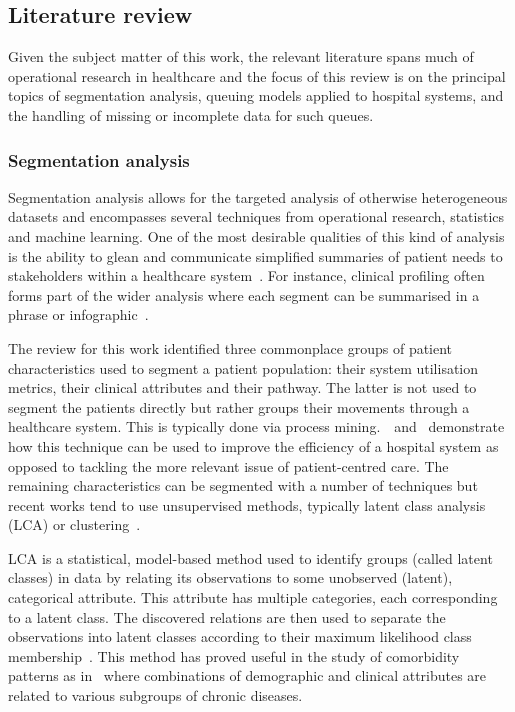\subsection{Literature review}\label{subsec:review}

Given the subject matter of this work, the relevant literature spans much of
operational research in healthcare and the focus of this review is on the
principal topics of segmentation analysis, queuing models applied to hospital
systems, and the handling of missing or incomplete data for such queues.

\subsubsection{Segmentation analysis}

Segmentation analysis allows for the targeted analysis of otherwise
heterogeneous datasets and encompasses several techniques from operational
research, statistics and machine learning. One of the most desirable qualities
of this kind of analysis is the ability to glean and communicate simplified
summaries of patient needs to stakeholders within a healthcare
system~\cite{Vuik2016b, Yoon2020}. For instance, clinical profiling often
forms part of the wider analysis where each segment can be summarised in a
phrase or infographic~\cite{Vuik2016a, Yan2019}.

The review for this work identified three commonplace groups of patient
characteristics used to segment a patient population: their system
utilisation metrics, their clinical attributes and their pathway. The latter
is not used to segment the patients directly but rather groups their movements
through a healthcare system. This is typically done via process
mining.~\cite{Arnolds2018}~and~\cite{Delias2015} demonstrate how this technique
can be used to improve the efficiency of a hospital system as opposed to
tackling the more relevant issue of patient-centred care. The remaining
characteristics can be segmented with a number of techniques but recent works
tend to use unsupervised methods, typically latent class analysis (LCA) or
clustering~\cite{Yan2018}.

LCA is a statistical, model-based method used to identify groups (called latent
classes) in data by relating its observations to some unobserved (latent),
categorical attribute. This attribute has multiple categories, each
corresponding to a latent class. The discovered relations are then used to
separate the observations into latent classes according to their maximum
likelihood class membership~\cite{Hagenaars2002,Lazarsfeld1968}. This method has
proved useful in the study of comorbidity patterns as
in~\cite{Kuwornu2014,Larsen2017} where combinations of demographic and clinical
attributes are related to various subgroups of chronic diseases.

